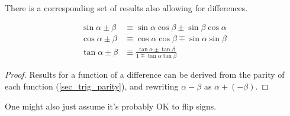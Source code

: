 There is a corresponding set of results also allowing for differences.
\begin{theorem} \label{thm_trig_compound}
\begin{align*}
\sin \alpha \pm \beta &\equiv
   \sin \alpha \cos \beta \pm \sin \beta \cos \alpha \\
\cos \alpha \pm \beta &\equiv
   \cos \alpha \cos \beta \mp \sin \alpha \sin \beta \\
\tan \alpha \pm \beta &\equiv
    \frac{\tan \alpha \pm \tan \beta}{1 \mp \tan \alpha \tan \beta}
\end{align*}
\end{theorem}
\begin{proof}
Results for a function of a difference can be derived from the parity of
each function (\ref{sec_trig_parity}), and rewriting \(\alpha - \beta\) as
\(\alpha + (-\beta)\).
\end{proof}
One might also just assume it's probably OK to flip signs.

